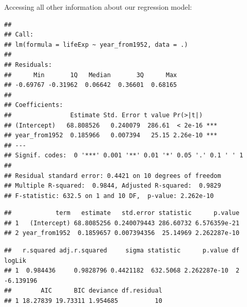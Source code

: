 \documentclass[]{book}
\makeatletter
\newenvironment{Shaded}{\begin{snugshade}}{\end{snugshade}}
\newcommand{\KeywordTok}[1]{\textcolor[rgb]{0.13,0.29,0.53}{\textbf{#1}}}
\newcommand{\StringTok}[1]{\textcolor[rgb]{0.31,0.60,0.02}{#1}}
\newcommand{\OperatorTok}[1]{\textcolor[rgb]{0.81,0.36,0.00}{\textbf{#1}}}
\newcommand{\NormalTok}[1]{#1}
\newenvironment{kframe}{%
\medskip{}
\setlength{\fboxsep}{.8em}
 \def\at@end@of@kframe{}%
 \ifinner\ifhmode%
  \def\at@end@of@kframe{\end{minipage}}%
  \begin{minipage}{\columnwidth}%
 \fi\fi%
 \def\FrameCommand##1{\hskip\@totalleftmargin \hskip-\fboxsep
 \colorbox{shadecolor}{##1}\hskip-\fboxsep
     \hskip-\linewidth \hskip-\@totalleftmargin \hskip\columnwidth}%
 \MakeFramed {\advance\hsize-\width
   \@totalleftmargin\z@ \linewidth\hsize
   \@setminipage}}%
 {\par\unskip\endMakeFramed%
 \at@end@of@kframe}
\renewenvironment{Shaded}{\begin{kframe}}{\end{kframe}}
\makeatother
\begin{document}
Accessing all other information about our regression model:

\begin{Shaded}
\end{Shaded}

\begin{verbatim}
## 
## Call:
## lm(formula = lifeExp ~ year_from1952, data = .)
## 
## Residuals:
##      Min       1Q   Median       3Q      Max 
## -0.69767 -0.31962  0.06642  0.36601  0.68165 
## 
## Coefficients:
##                Estimate Std. Error t value Pr(>|t|)    
## (Intercept)   68.808526   0.240079  286.61  < 2e-16 ***
## year_from1952  0.185966   0.007394   25.15 2.26e-10 ***
## ---
## Signif. codes:  0 '***' 0.001 '**' 0.01 '*' 0.05 '.' 0.1 ' ' 1
## 
## Residual standard error: 0.4421 on 10 degrees of freedom
## Multiple R-squared:  0.9844, Adjusted R-squared:  0.9829 
## F-statistic: 632.5 on 1 and 10 DF,  p-value: 2.262e-10
\end{verbatim}

\begin{Shaded}
\end{Shaded}

\begin{verbatim}
##            term   estimate   std.error statistic      p.value
## 1   (Intercept) 68.8085256 0.240079443 286.60732 6.576359e-21
## 2 year_from1952  0.1859657 0.007394356  25.14969 2.262287e-10
\end{verbatim}

\begin{Shaded}
\end{Shaded}

\begin{verbatim}
##   r.squared adj.r.squared     sigma statistic      p.value df    logLik
## 1  0.984436     0.9828796 0.4421182  632.5068 2.262287e-10  2 -6.139196
##        AIC      BIC deviance df.residual
## 1 18.27839 19.73311 1.954685          10
\end{verbatim}
\end{document}
